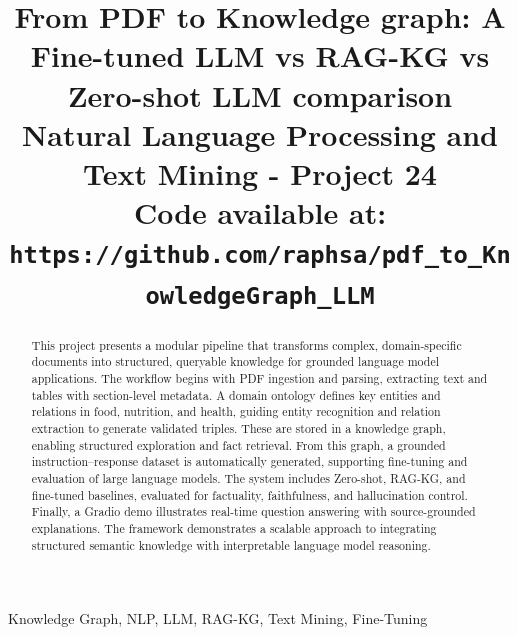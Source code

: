 \documentclass[conference]{IEEEtran}
\begin{document}
\title{From PDF to Knowledge graph: A Fine-tuned LLM vs RAG-KG vs Zero-shot LLM comparison \\
{\footnotesize Natural Language Processing and Text Mining - Project 24} \\
{\small \textbf{Code available at:} \texttt{https://github.com/raphsa/pdf\_to\_KnowledgeGraph\_LLM}}
}

\author{
\and
{}
\and
{}
}

\maketitle

\begin{abstract}
This project presents a modular pipeline that transforms complex, domain-specific documents into structured, queryable knowledge for grounded language model applications. The workflow begins with PDF ingestion and parsing, extracting text and tables with section-level metadata. A domain ontology defines key entities and relations in food, nutrition, and health, guiding entity recognition and relation extraction to generate validated triples. These are stored in a knowledge graph, enabling structured exploration and fact retrieval. From this graph, a grounded instruction–response dataset is automatically generated, supporting fine-tuning and evaluation of large language models. The system includes Zero-shot, RAG-KG, and fine-tuned baselines, evaluated for factuality, faithfulness, and hallucination control. Finally, a Gradio demo illustrates real-time question answering with source-grounded explanations. The framework demonstrates a scalable approach to integrating structured semantic knowledge with interpretable language model reasoning.
\end{abstract}

\begin{IEEEkeywords}
Knowledge Graph, NLP, LLM, RAG-KG, Text Mining, Fine-Tuning
\end{IEEEkeywords}












\end{document}
